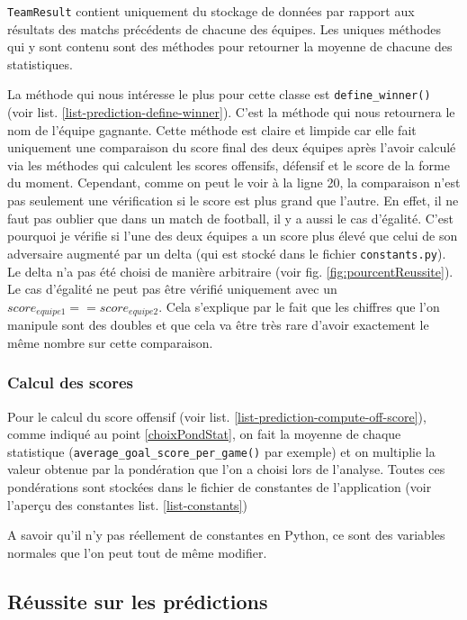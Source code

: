\documentclass[a4paper,14pt]{extarticle}
\begin{document}
{\texttt{TeamResult} contient uniquement du stockage de données par rapport aux résultats des matchs précédents de chacune des équipes. Les uniques méthodes qui y sont contenu sont des méthodes pour retourner la moyenne de chacune des statistiques.

La méthode qui nous intéresse le plus pour cette classe est \texttt{define\_winner()} (voir list. \ref{list-prediction-define-winner}). C'est la méthode qui nous retournera le nom de l'équipe gagnante. Cette méthode est claire et limpide car elle fait uniquement une comparaison du score final des deux équipes après l'avoir calculé via les méthodes qui calculent les scores offensifs, défensif et le score de la forme du moment. 
Cependant, comme on peut le voir à la ligne 20, la comparaison n'est pas seulement une vérification si le score est plus grand que l'autre. En effet, il ne faut pas oublier que dans un match de football, il y a aussi le cas d'égalité. C'est pourquoi je vérifie si l'une des deux équipes a un score plus élevé que celui de son adversaire augmenté par un delta (qui est stocké dans le fichier \texttt{constants.py}). Le delta n'a pas été choisi de manière arbitraire (voir fig. \ref{fig:pourcentReussite}). Le cas d'égalité ne peut pas être vérifié uniquement avec un $score_{equipe1} == score_{equipe2}$. Cela s'explique par le fait que les chiffres que l'on manipule sont des doubles et que cela va être très rare d'avoir exactement le même nombre sur cette comparaison.


\subsubsection{Calcul des scores}

Pour le calcul du score offensif (voir list. \ref{list-prediction-compute-off-score}), comme indiqué au point \ref{choixPondStat}, on fait la moyenne de chaque statistique (\texttt{average\_goal\_score\_per\_game()} par exemple) et on multiplie la valeur obtenue par la pondération que l'on a choisi lors de l'analyse. Toutes ces pondérations sont stockées dans le fichier de constantes de l'application (voir l'aperçu des constantes list. \ref{list-constants})

A savoir qu'il n'y pas réellement de constantes en Python, ce sont des variables normales que l'on peut tout de même modifier.

\subsection{Réussite sur les prédictions}

}
\end{document}
